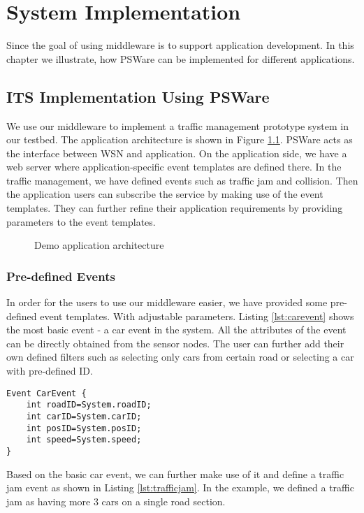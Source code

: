 \chapter{System Implementation}
\label{chapter:implementation}
Since the goal of using middleware is to support application development. In this chapter we illustrate, how PSWare can be implemented for different applications.

\section{ITS Implementation Using PSWare}
We use our middleware to implement a traffic management prototype system in our testbed. The application architecture is shown in Figure \ref{fig:appdemo}. PSWare acts as the interface between WSN and application. On the application side, we have a web server where application-specific event templates are defined there. In the traffic management, we have defined events such as traffic jam and collision. Then the application users can subscribe the service by making use of the event templates. They can further refine their application requirements by providing parameters to the event templates.

\begin{figure}
\centering
{}
\caption{Demo application architecture}
\label{fig:appdemo}
\end{figure}

\subsection{Pre-defined Events}
In order for the users to use our middleware easier, we have provided some pre-defined event templates. With adjustable parameters. Listing \ref{lst:carevent} shows the most basic event - a car event in the system. All the attributes of the event can be directly obtained from the sensor nodes. The user can further add their own defined filters such as selecting only cars from certain road or selecting a car with pre-defined ID.

\begin{lstlisting}[caption=Car event, label=lst:carevent]
Event CarEvent {
	int roadID=System.roadID;
	int carID=System.carID;
	int posID=System.posID;
	int speed=System.speed;
}
\end{lstlisting}

Based on the basic car event, we can further make use of it and define a traffic jam event as shown in Listing \ref{lst:trafficjam}. In the example, we defined a traffic jam as having more 3 cars on a single road section.

